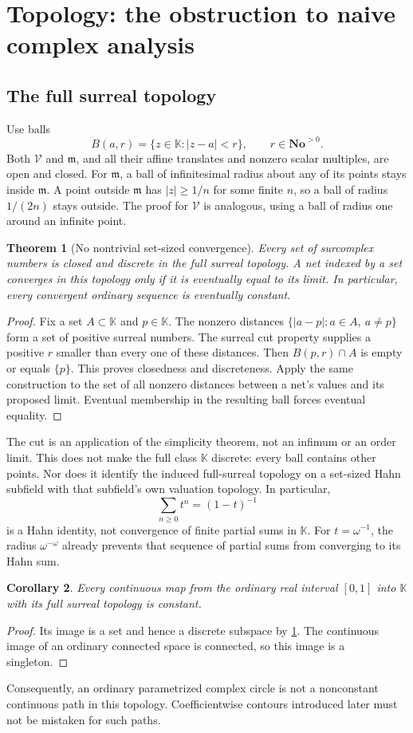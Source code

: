 \documentclass[11pt,oneside]{article}
\numberwithin{equation}{section}
\newtheorem{theorem}{Theorem}[section]
\newtheorem{corollary}[theorem]{Corollary}
\theoremstyle{definition}
\theoremstyle{remark}\newtheorem{remark}[theorem]{Remark}
\newcommand{\No}{\mathbf{No}}
\newcommand{\K}{\mathbb K}
\newcommand{\m}{\mathfrak m}
\newcommand{\fin}{\mathcal V}
\begin{document}
\section{Topology: the obstruction to naive complex analysis}
\subsection{The full surreal topology}
Use balls
\[
 B(a,r)=\{z\in\K:|z-a|<r\},\qquad r\in\No^{>0}.
\]
Both $\fin$ and $\m$, and all their affine translates and nonzero
scalar multiples, are open and closed. For $\m$, a ball of infinitesimal
radius about any of its points stays inside $\m$. A point outside $\m$
has $|z|\geq1/n$ for some finite $n$, so a ball of radius $1/(2n)$ stays
outside. The proof for $\fin$ is analogous, using a ball of radius one
around an infinite point.

\begin{theorem}[No nontrivial set-sized convergence]\label{thm:no-convergence}
Every set of surcomplex numbers is closed and discrete in the full surreal
topology. A net indexed by a set converges in this topology only if it is
eventually equal to its limit. In particular, every convergent ordinary
sequence is eventually constant.
\end{theorem}
\begin{proof}
Fix a set $A\subset\K$ and $p\in\K$. The nonzero distances
$\{|a-p|:a\in A,\ a\ne p\}$ form a set of positive surreal numbers.
The surreal cut property supplies a positive $r$ smaller than every one of
these distances. Then $B(p,r)\cap A$ is empty or equals $\{p\}$.
This proves closedness and discreteness. Apply the same construction to
the set of all nonzero distances between a net's values and its proposed
limit. Eventual membership in the resulting ball forces eventual equality.
\end{proof}
The cut is an application of the simplicity theorem, not an infimum or
an order limit. This does not make the full class $\K$ discrete: every ball
contains other points. Nor does it identify the induced full-surreal topology
on a set-sized Hahn subfield with that subfield's own valuation topology. In particular,
\[
 \sum_{n\geq0}t^n=(1-t)^{-1}
\]
is a Hahn identity, not convergence of finite partial sums in $\K$.
For $t=\omega^{-1}$, the radius $\omega^{-\omega}$ already prevents that
sequence of partial sums from converging to its Hahn sum.

\begin{corollary}\label{cor:no-path}
Every continuous map from the ordinary real interval $[0,1]$ into $\K$
with its full surreal topology is constant.
\end{corollary}
\begin{proof}
Its image is a set and hence a discrete subspace by
\cref{thm:no-convergence}. The continuous image of an ordinary connected
space is connected, so this image is a singleton.
\end{proof}
Consequently, an ordinary parametrized complex circle is not a nonconstant
continuous path in this topology. Coefficientwise contours introduced
later must not be mistaken for such paths.
\end{document}
